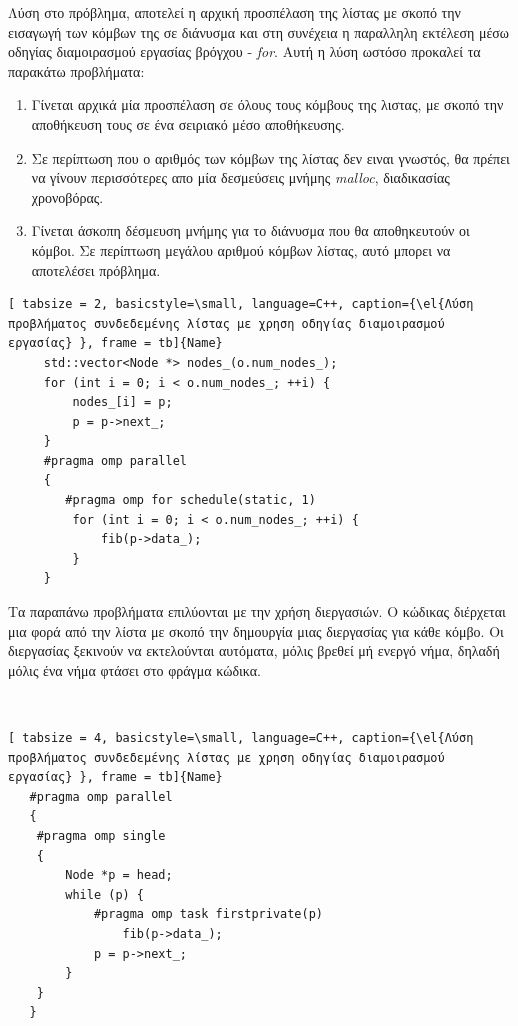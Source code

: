 \documentclass[12pt]{article}
\newcommand{\en}[1]{\foreignlanguage{english}{#1}}
\newcommand{\el}[1]{\selectlanguage{greek}{#1}\selectlanguage{english}}
\begin{document}
Λύση στο πρόβλημα, αποτελεί η αρχική προσπέλαση της λίστας με σκοπό την εισαγωγή των κόμβων της σε διάνυσμα και στη συνέχεια η παραλληλη εκτέλεση μέσω οδηγίας διαμοιρασμού εργασίας βρόγχου - \emph{\en{for}}.
Αυτή η λύση ωστόσο προκαλεί τα παρακάτω προβλήματα:
\begin{enumerate}
\item Γίνεται αρχικά μία προσπέλαση σε όλους τους κόμβους της λιστας, με σκοπό την αποθήκευση τους σε ένα σειριακό μέσο αποθήκευσης.
\item Σε περίπτωση που ο αριθμός των κόμβων της λίστας δεν ειναι γνωστός, θα πρέπει να γίνουν περισσότερες απο μία δεσμεύσεις μνήμης \emph{\en{malloc}}, διαδικασίας χρονοβόρας.
\item Γίνεται άσκοπη δέσμευση μνήμης για το διάνυσμα που θα αποθηκευτούν οι κόμβοι. Σε περίπτωση μεγάλου αριθμού κόμβων λίστας, αυτό μπορει να αποτελέσει πρόβλημα.

\end{enumerate}
\clearpage
{}
\begin{lstlisting}[ tabsize = 2, basicstyle=\small, language=C++, caption={\el{Λύση προβλήματος συνδεδεμένης λίστας με χρηση οδηγίας διαμοιρασμού εργασίας} }, frame = tb]{Name}
	 std::vector<Node *> nodes_(o.num_nodes_);  
     for (int i = 0; i < o.num_nodes_; ++i) {
         nodes_[i] = p;
         p = p->next_;
     }
	 #pragma omp parallel
     {
 		#pragma omp for schedule(static, 1) 
         for (int i = 0; i < o.num_nodes_; ++i) {
             fib(p->data_);
         }
     }
\end{lstlisting}

Τα παραπάνω προβλήματα επιλύονται με την χρήση διεργασιών. Ο κώδικας διέρχεται μια φορά από την λίστα με σκοπό την δημουργία μιας διεργασίας για κάθε κόμβο. Οι διεργασίας ξεκινούν να εκτελούνται αυτόματα, μόλις βρεθεί μή ενεργό νήμα, δηλαδή μόλις ένα νήμα φτάσει στο φράγμα κώδικα.

\ \\
\begin{lstlisting}[ tabsize = 4, basicstyle=\small, language=C++, caption={\el{Λύση προβλήματος συνδεδεμένης λίστας με χρηση οδηγίας διαμοιρασμού εργασίας} }, frame = tb]{Name}
   #pragma omp parallel
   {
   	#pragma omp single
   	{
   		Node *p = head;
   		while (p) {
   			#pragma omp task firstprivate(p)
   				fib(p->data_);
   			p = p->next_;
   		}
   	}
   }

\end{lstlisting}
\end{document}
